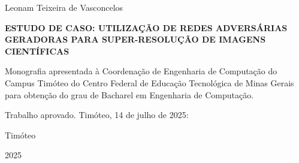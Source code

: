 \documentclass[
	11pt,
	openright,
	oneside,
	a4paper,
	english,
	french,
	spanish,
	brazil,	
	]{abntex2}
\begin{document}
\frenchspacing 

 \pretextual

\imprimircapa

\imprimirfolhaderosto*

\begin{folhadeaprovacao}

  \begin{center}
    {\ABNTEXchapterfont\large Leonam Teixeira de Vasconcelos}

    \vspace*{\fill}\vspace*{\fill}
    \begin{center}
      \ABNTEXchapterfont\bfseries\Large ESTUDO DE CASO: UTILIZAÇÃO DE REDES ADVERSÁRIAS GERADORAS PARA SUPER-RESOLUÇÃO DE IMAGENS CIENTÍFICAS
    \end{center}
    \vspace*{\fill}
    
    \hspace{.45\textwidth}
    \begin{minipage}{.5\textwidth}
        Monografia apresentada à Coordenação de Engenharia de Computação do Campus Timóteo do Centro Federal de Educação Tecnológica de Minas Gerais para obtenção do grau de Bacharel em Engenharia de Computação.
    \end{minipage}%
    \vspace*{\fill}
   \end{center}
        
   Trabalho aprovado. Timóteo, 14 de julho de 2025:

      
   \begin{center}
    \vspace*{0.5cm}
    {\large Timóteo}
    \par
    {\large 2025}
    \vspace*{1cm}
  \end{center}
  
\end{folhadeaprovacao}
\end{document}
